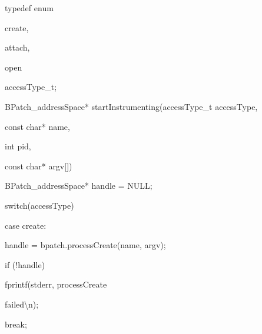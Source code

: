 {

typedef enum {}



{

create,}



{

attach,}



{

open}



{

} accessType_t;





\bigskip



{

BPatch_addressSpace* startInstrumenting(accessType_t accessType,}



{

const char* name,}



{

int pid,}



{

const char* argv[]) {}



{

BPatch_addressSpace* handle = NULL;}





\bigskip



{

switch(accessType) {}



{

case create:}



{

handle = bpatch.processCreate(name, argv);}



{

if (!handle) { fprintf(stderr, {\textquotedbl}processCreate

failed{\textbackslash}n{\textquotedbl}); }}



{

break;}



}}}
